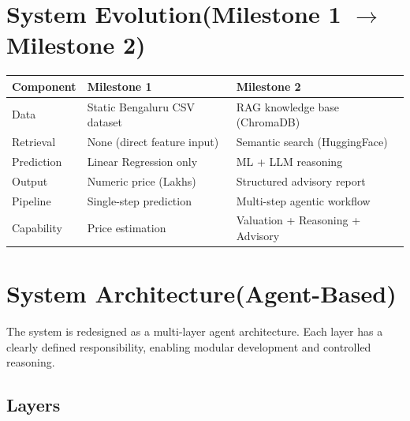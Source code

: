 \documentclass[11pt,a4paper]{article}
\newcommand{\tableheadercolor}{\rowcolor{headerblue}}
\newcommand{\tableheaderfont}{\color{white}\bfseries}
\begin{document}

\section{System Evolution\;\;(Milestone 1 $\rightarrow$ Milestone 2)}

\vspace{0.6em}
\begin{tabularx}{\textwidth}{>{\raggedright\arraybackslash}p{2.8cm}
                              >{\raggedright\arraybackslash}X
                              >{\raggedright\arraybackslash}X}
\tableheadercolor
\tableheaderfont Component & \tableheaderfont Milestone 1 & \tableheaderfont Milestone 2 \\
\midrule
Data          & Static Bengaluru CSV dataset   & RAG knowledge base (ChromaDB)    \\[5pt]
Retrieval     & None (direct feature input)    & Semantic search (HuggingFace)    \\[5pt]
Prediction    & Linear Regression only         & ML + LLM reasoning               \\[5pt]
Output        & Numeric price (Lakhs)          & Structured advisory report        \\[5pt]
Pipeline      & Single-step prediction         & Multi-step agentic workflow        \\[5pt]
Capability    & Price estimation               & Valuation + Reasoning + Advisory   \\
\bottomrule
\end{tabularx}


\newpage

\section{System Architecture\;\;(Agent-Based)}

The system is redesigned as a multi-layer agent architecture. Each layer has a clearly defined responsibility, enabling modular development and controlled reasoning.

\subsection{Layers}
\end{document}
